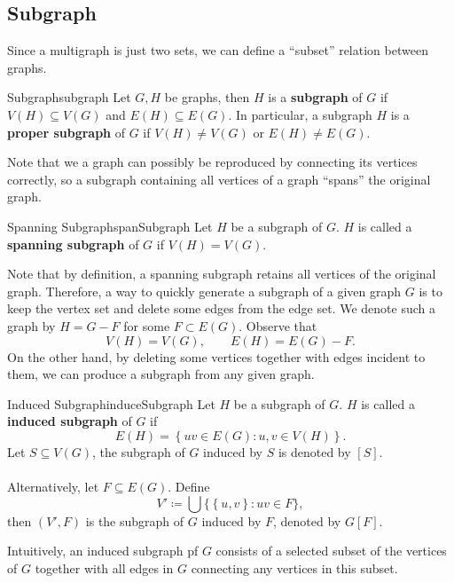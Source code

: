 \documentclass[math]{amznotes}
\theoremstyle{remark}
\begin{document}
\subsection{Subgraph}
Since a multigraph is just two sets, we can define a ``subset'' relation between graphs.
\begin{dfnbox}{Subgraph}{subgraph}
    Let $G, H$ be graphs, then $H$ is a {\color{red} \textbf{subgraph}} of $G$ if $V(H) \subseteq V(G)$ and $E(H) \subseteq E(G)$. In particular, a subgraph $H$ is a {\color{red} \textbf{proper subgraph}} of $G$ if $V(H) \neq V(G)$ or $E(H) \neq E(G)$.
\end{dfnbox}
Note that we a graph can possibly be reproduced by connecting its vertices correctly, so a subgraph containing all vertices of a graph ``spans'' the original graph.
\begin{dfnbox}{Spanning Subgraph}{spanSubgraph}
    Let $H$ be a subgraph of $G$. $H$ is called a {\color{red} \textbf{spanning subgraph}} of $G$ if $V(H) = V(G)$.
\end{dfnbox}
Note that by definition, a spanning subgraph retains all vertices of the original graph. Therefore, a way to quickly generate a subgraph of a given graph $G$ is to keep the vertex set and delete some edges from the edge set. We denote such a graph by $H = G - F$ for some $F \subset E(G)$. Observe that 
\begin{equation*}
    V(H) = V(G), \qquad E(H) = E(G) - F.
\end{equation*}
On the other hand, by deleting some vertices together with edges incident to them, we can produce a subgraph from any given graph.
\begin{dfnbox}{Induced Subgraph}{induceSubgraph}
    Let $H$ be a subgraph of $G$. $H$ is called a {\color{red} \textbf{induced subgraph}} of $G$ if
    \begin{equation*}
        E(H) = \left\{uv \in E(G) \colon u, v \in V(H)\right\}.
    \end{equation*}
    Let $S \subseteq V(G)$, the subgraph of $G$ induced by $S$ is denoted by $[S]$.
    \\\\
    Alternatively, let $F \subseteq E(G)$. Define
    \begin{equation*}
        V' \coloneqq \bigcup \bigl\{\left\{u, v\right\} \colon uv \in F\bigr\},
    \end{equation*}
    then $(V', F)$ is the subgraph of $G$ induced by $F$, denoted by $G[F]$.
\end{dfnbox}
Intuitively, an induced subgraph pf $G$ consists of a selected subset of the vertices of $G$ together with all edges in $G$ connecting any vertices in this subset.
\end{document}
